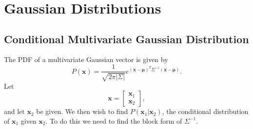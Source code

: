 \section{Gaussian Distributions}

\subsection{Conditional Multivariate Gaussian Distribution}
The PDF of a multivariate Gaussian vector is given by
\begin{equation}
P(\bm{x}) = \frac{1}{\sqrt{2\pi |\Sigma|}}e^{(\bm{x}-\bm{\mu})^T\Sigma^{-1}(\bm{x}-\bm{\mu})}.
\end{equation}
Let
\begin{equation}
\bm{x} = \begin{bmatrix}
\bm{x}_1 \\
\bm{x}_2
\end{bmatrix},
\end{equation}
and let $\bm{x}_2$ be given. We then wish to find $P(\bm{x}_1|\bm{x}_2)$, the conditional distribution of $\bm{x}_1$ given $\bm{x}_2$. To do this we need to find the block form of $\Sigma^{-1}$.

